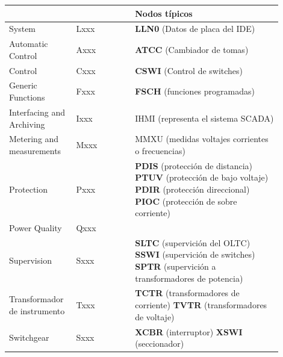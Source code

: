 \documentclass[a5paper]{book}%
\begin{document}
\begin{table}[H]
  \centering
  \label{Ejemplos de nodos Lógicos}

  \small
  \begin{tabular}{|p{0.2\linewidth} | p{0.2\linewidth}|p{0.5\linewidth}|}
    \hline
    \rowcolor{black}
    \color{white}{Grupo funcional} & \color{white}{Designación} &\color{white} {Nodos típicos} \\\hline
    System & Lxxx & \textbf{LLN0} (Datos de placa del IDE) \\\hline
    Automatic Control & Axxx & \textbf{ATCC} (Cambiador de tomas) \\\hline
    Control & Cxxx & \textbf{CSWI}  (Control de switches)  \\\hline
    Generic Functions & Fxxx & \textbf{FSCH} (funciones programadas) \\\hline
    Interfacing and Archiving & Ixxx & IHMI (representa el sistema SCADA) \\\hline
    Metering  and measurements & Mxxx & MMXU (medidas voltajes corrientes  o frecuencias) \\\hline
    Protection & Pxxx & \textbf{PDIS} (protección de distancia) \textbf{PTUV} (protección de bajo voltaje) \textbf{PDIR} (protección direccional) \textbf{PIOC} (protección de sobre corriente)\\\hline

    Power Quality & Qxxx & \\\hline
    Supervision & Sxxx & \textbf{SLTC} (supervición del OLTC) \textbf{SSWI} (supervición de switches) \textbf{SPTR} (supervición a transformadores de potencia) \\\hline

    Transformador de instrumento & Txxx  & \textbf{TCTR} (transformadores de corriente) \textbf{TVTR} (transformadores de voltaje) \\\hline

    Switchgear & Sxxx & \textbf{XCBR} (interruptor) \textbf{XSWI} (seccionador) \\\hline
   
    \end{tabular}
  \end{table}
\end{document}
